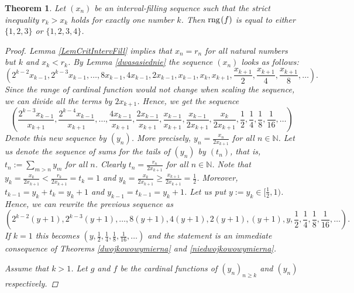 \documentclass{amsart}
\newtheorem{theorem}{Theorem}[section]
\theoremstyle{definition}
\newcommand{\rng}{{\rm rng} \hspace{0.03cm}}
\begin{document}
\begin{theorem}\label{jednaostra}
Let $(x_n)$ be an interval-filling sequence such that the strict inequality $r_k>x_k$ holds for exactly one number $k$. Then $\rng(f)$ is equal to either $\{1,2,3\}$ or $\{1,2,3,4\}$.
\begin{proof}
Lemma \ref{LemCritIntervFill} implies that $x_n=r_n$ for all natural numbers but $k$ and $x_k<r_k$. By Lemma \ref{dwasasiednie} the sequence $(x_n)$ looks as follows:
$$\left(2^{k-2}x_{k-1}, 2^{k-3}x_{k-1}, \ldots, 8x_{k-1} , 4x_{k-1} , 2x_{k-1} , x_{k-1}, x_k, x_{k+1}, \frac{x_{k+1}}{2},\frac{x_{k+1}}{4},\frac{x_{k+1}}{8}, \ldots\right). $$
Since the range of cardinal function would not change when scaling the sequence, we can divide all the terms by $2x_{k+1}$. Hence, we get the sequence
$$
\left(\frac{2^{k-3}x_{k-1}}{x_{k+1}},  \frac{2^{k-4}x_{k-1}}{x_{k+1}}, \ldots,  \frac{4x_{k-1}}{x_{k+1}} ,  \frac{2x_{k-1}}{x_{k+1}} ,  \frac{x_{k-1}}{x_{k+1}} , \frac{x_{k-1}}{2x_{k+1}}, \frac{x_k}{2x_{k+1}}, \frac{1}{2}, \frac{1}{4},\frac{1}{8},\frac{1}{16}, \ldots\right) 
$$ 
Denote this new sequence by $(y_n)$. More precisely, $y_n=\frac{x_{n}}{2x_{k+1}}$ for all $n\in\mathbb{N}$. Let us denote the sequence of sums for the tails of $(y_{n})$ by $(t_n)$, that is, $t_{n}:=\sum_{m>n}y_{m}$ for all $n$. Clearly $t_n=\frac{r_{n}}{2x_{k+1}}$ for all $n\in\mathbb{N}$.
Note that $y_k=\frac{x_k}{2x_{k+1}}<\frac{r_k}{2x_{k+1}}=t_k=1$ and $y_k=\frac{x_k}{2x_{k+1}}\geq \frac{x_{k+1}}{2x_{k+1}}=\frac{1}{2}$. Moreover, $t_{k-1}=y_k+t_k=y_k+1$ and $y_{k-1}=t_{k-1}=y_k+1$. Let us put $y:=y_k\in [\frac{1}{2},1)$. Hence, we can rewrite the previous sequence as 
$$
\left(2^{k-2}(y+1), 2^{k-3}(y+1), \ldots,  8(y+1) ,  4(y+1),  2(y+1) ,(y+1), y, \frac{1}{2}, \frac{1}{4},\frac{1}{8},\frac{1}{16}, \ldots\right).
$$
If $k=1$ this becomes $( y, \frac{1}{2}, \frac{1}{4},\frac{1}{8},\frac{1}{16}, \ldots)$ and the statement is an immediate consequence of Theorems \ref{dwojkowowymierna} and \ref{niedwojkowowymierna}.

Assume that $k>1$. Let $g$ and $f$ be the cardinal functions of $(y_n)_{n\geq k}$ and $(y_n)$ respectively.


\end{proof}
\end{theorem}
\end{document}
